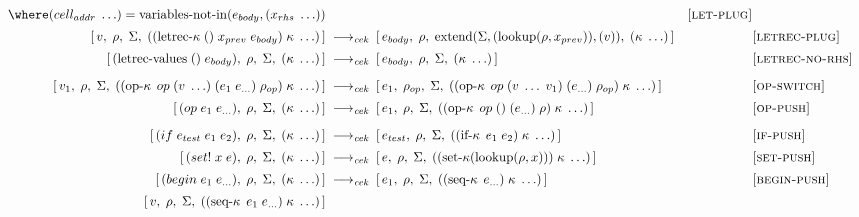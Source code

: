 \begin{figure}[!h]
{\begin{minipage}{\textwidth}
\begin{align*}
          \where (cell_{addr}\;\ldots)=\operatorname{variables-not-in}(e_{body},(x_{rhs}\;\ldots))
        &&\textsc{[let‑plug]}\\[2pt]
%
        [\,v,\;\rho,\;\Sigma,\;((\operatorname{letrec-\kappa}\;()\;x_{prev}\;e_{body})\;\kappa\;\ldots)\,]
        &\;\longrightarrow_{\textit{cek}}\;
        [\,e_{body},\;\rho,\;\operatorname{extend}(\Sigma,(\operatorname{lookup}(\rho,x_{prev})),(v)),\;(\kappa\;\ldots)\,]
        &&\textsc{[letrec‑plug]}\\[2pt]
%
        [\,(\operatorname{letrec-values}\;()\;e_{body}),\;\rho,\;\Sigma,\;(\kappa\;\ldots)\,]
        &\;\longrightarrow_{\textit{cek}}\;
        [\,e_{body},\;\rho,\;\Sigma,\;(\kappa\;\ldots)\,]
        &&\textsc{[letrec‑no‑rhs]}\\[6pt]
%
        [\,v_1,\;\rho,\;\Sigma,\;((\operatorname{op-\kappa}\;op\;(v\;\ldots)\;(e_1\;e_{\ldots})\;\rho_{op})\;\kappa\;\ldots)\,]
        &\;\longrightarrow_{\textit{cek}}\;
        [\,e_1,\;\rho_{op},\;\Sigma,\;((\operatorname{op-\kappa}\;op\;(v\;\ldots\;v_1)\;(e_{\ldots})\;\rho_{op})\;\kappa\;\ldots)\,]
        &&\textsc{[op‑switch]}\\[2pt]
%
        [\,(op\;e_1\;e_{\ldots}),\;\rho,\;\Sigma,\;(\kappa\;\ldots)\,]
        &\;\longrightarrow_{\textit{cek}}\;
        [\,e_1,\;\rho,\;\Sigma,\;((\operatorname{op-\kappa}\;op\;()\;(e_{\ldots})\;\rho)\;\kappa\;\ldots)\,]
        &&\textsc{[op‑push]}\\[6pt]
%
        [\,(if\;e_{test}\;e_1\;e_2),\;\rho,\;\Sigma,\;(\kappa\;\ldots)\,]
        &\;\longrightarrow_{\textit{cek}}\;
        [\,e_{test},\;\rho,\;\Sigma,\;((\operatorname{if-\kappa}\;e_1\;e_2)\;\kappa\;\ldots)\,]
        &&\textsc{[if‑push]}\\[2pt]
%
        [\,(set!\;x\;e),\;\rho,\;\Sigma,\;(\kappa\;\ldots)\,]
        &\;\longrightarrow_{\textit{cek}}\;
        [\,e,\;\rho,\;\Sigma,\;((\operatorname{set-\kappa}(\operatorname{lookup}(\rho,x)))\;\kappa\;\ldots)\,]
        &&\textsc{[set‑push]}\\[2pt]
%
        [\,(begin\;e_1\;e_{\ldots}),\;\rho,\;\Sigma,\;(\kappa\;\ldots)\,]
        &\;\longrightarrow_{\textit{cek}}\;
        [\,e_1,\;\rho,\;\Sigma,\;((\operatorname{seq-\kappa}\;e_{\ldots})\;\kappa\;\ldots)\,]
        &&\textsc{[begin‑push]}\\[2pt]
%
        [\,v,\;\rho,\;\Sigma,\;((\operatorname{seq-\kappa}\;e_1\;e_{\ldots})\;\kappa\;\ldots)\,]

\end{align*}
\end{minipage}}
\end{figure}
